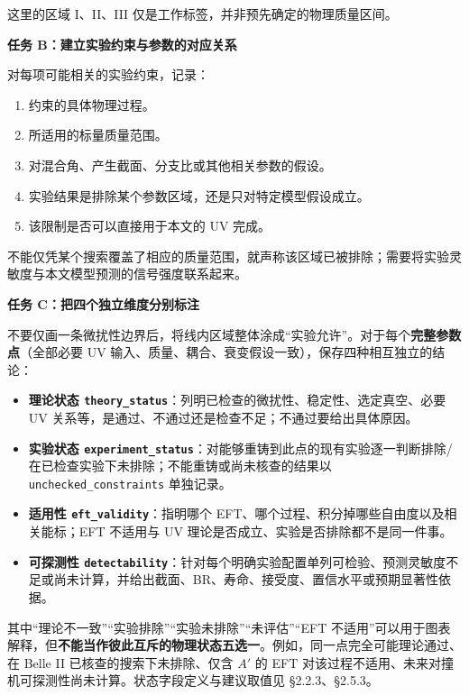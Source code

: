 \documentclass[
]{article}
\providecommand{\tightlist}{%
  \setlength{\itemsep}{0pt}\setlength{\parskip}{0pt}}
\begin{document}
这里的区域 I、II、III 仅是工作标签，并非预先确定的物理质量区间。

\textbf{任务 B：建立实验约束与参数的对应关系}

对每项可能相关的实验约束，记录：

\begin{enumerate}
\def\labelenumi{\arabic{enumi}.}
\tightlist
\item
  约束的具体物理过程。
\item
  所适用的标量质量范围。
\item
  对混合角、产生截面、分支比或其他相关参数的假设。
\item
  实验结果是排除某个参数区域，还是只对特定模型假设成立。
\item
  该限制是否可以直接用于本文的 UV 完成。
\end{enumerate}

不能仅凭某个搜索覆盖了相应的质量范围，就声称该区域已被排除；需要将实验灵敏度与本文模型预测的信号强度联系起来。

\textbf{任务 C：把四个独立维度分别标注}

不要仅画一条微扰性边界后，将线内区域整体涂成``实验允许''。对于每个\textbf{完整参数点}（全部必要
UV 输入、质量、耦合、衰变假设一致），保存四种相互独立的结论：

\begin{itemize}
\tightlist
\item
  \textbf{理论状态
  \texttt{theory\_status}}：列明已检查的微扰性、稳定性、选定真空、必要
  UV 关系等，是通过、不通过还是检查不足；不通过要给出具体原因。
\item
  \textbf{实验状态
  \texttt{experiment\_status}}：对能够重铸到此点的现有实验逐一判断排除/在已检查实验下未排除；不能重铸或尚未核查的结果以
  \texttt{unchecked\_constraints} 单独记录。
\item
  \textbf{适用性 \texttt{eft\_validity}}：指明哪个
  EFT、哪个过程、积分掉哪些自由度以及相关能标；EFT 不适用与 UV
  理论是否成立、实验是否排除都不是同一件事。
\item
  \textbf{可探测性
  \texttt{detectability}}：针对每个明确实验配置单列可检验、预测灵敏度不足或尚未计算，并给出截面、BR、寿命、接受度、置信水平或预期显著性依据。
\end{itemize}

其中``理论不一致''``实验排除''``实验未排除''``未评估''``EFT
不适用''可以用于图表解释，但\textbf{不能当作彼此互斥的物理状态五选一}。例如，同一点完全可能理论通过、在
Belle II 已核查的搜索下未排除、仅含 \(A'\) 的 EFT
对该过程不适用、未来对撞机可探测性尚未计算。状态字段定义与建议取值见
§2.2.3、§2.5.3。
\end{document}

